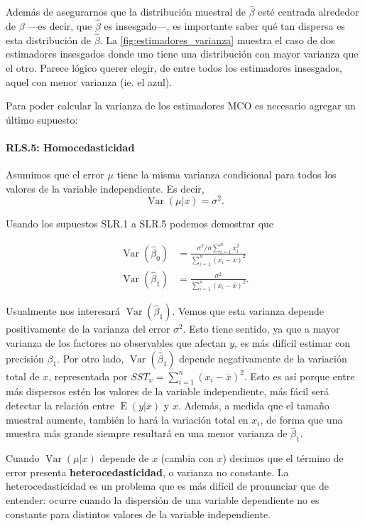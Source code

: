 \documentclass{report}\usepackage[]{graphicx}\usepackage[]{color}
\newcommand*{\kw}[1]{\textbf{#1}\index{#1}}
\newcommand{\Var}{\operatorname{Var}}
\newcommand{\E}{\operatorname{E}}
\begin{document}
Además de asegurarnos que la distribución muestral de $\hat\beta$ esté centrada alrededor de $\beta$ ---es decir, que $\hat\beta$ es insesgado---, es importante saber qué tan dispersa es esta distribución de $\hat\beta$.
La \autoref{fig:estimadores_varianza} muestra el caso de dos estimadores insesgados donde uno tiene una distribución con mayor varianza que el otro.
Parece lógico querer elegir, de entre todos los estimadores insesgados, aquel con menor varianza (ie. el azul).

Para poder calcular la varianza de los estimadores MCO es necesario agregar un último supuesto:

\paragraph{RLS.5: Homocedasticidad} 
Asumimos que el error $\mu$ tiene la misma varianza condicional para todos los valores de la variable independiente. Es decir,
\begin{equation}
\Var(\mu | x) = \sigma^2.
\end{equation}

Usando los supuestos SLR.1 a SLR.5 podemos demostrar que

\begin{align}
\Var(\hat\beta_0) &= \frac{\sigma^2/n \sum_{i=1}^n x_i^2}{\sum_{i=1}^n (x_i - \overline x)^2} \label{eq:var_hat_beta0} \\
\Var(\hat\beta_1) &= \frac{\sigma^2}{\sum_{i=1}^n (x_i - \overline x)^2}.\label{eq:var_hat_beta1}
\end{align}

Usualmente nos interesará $\Var(\hat\beta_1)$.
Vemos que esta varianza depende positivamente de la varianza del error $\sigma^2$. Esto tiene sentido, ya que a mayor varianza de los factores no observables que afectan $y$, es más difícil estimar con precisión $\beta_1$.
Por otro lado, $\Var(\hat\beta_1)$ depende negativamente de la variación total de $x$, representada por $SST_x = \sum_{i=1}^n (x_i - \overline x)^2$. Esto es así porque entre más dispersos estén los valores de la variable independiente, más fácil será detectar la relación entre $\E(y|x)$ y $x$.
Además, a medida que el tamaño muestral aumente, también lo hará la variación total en $x_i$, de forma que una muestra más grande siempre resultará en una menor varianza de $\hat\beta_1$.

Cuando $\Var(\mu | x)$ depende de $x$ (cambia con $x$) decimos que el término de error presenta \kw{heterocedasticidad}, o varianza no constante.
La heterocedasticidad es un problema que es más difícil de pronunciar que de entender: ocurre cuando la dispersión de una variable dependiente no es constante para distintos valores de la variable independiente.
\end{document}
